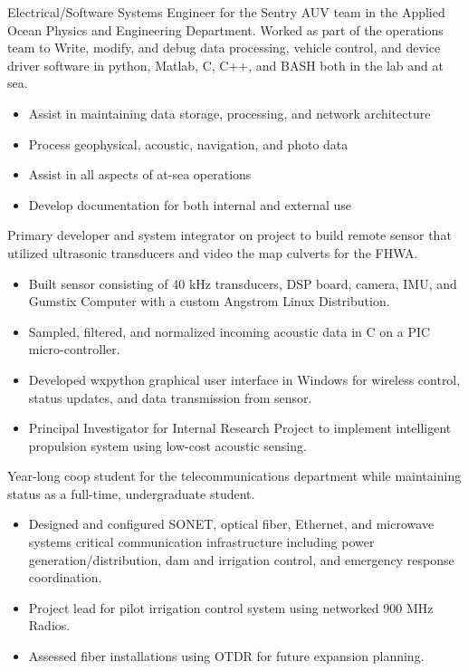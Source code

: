 \documentclass[11pt,a4paper,sans]{moderncv}
\begin{document}
{
Electrical/Software Systems Engineer for the Sentry AUV team in the Applied Ocean Physics 
and Engineering Department. Worked as part of the operations team to Write, modify, 
and debug data processing, vehicle control, and device driver software in python, 
Matlab, C, C++, and BASH both in the lab and at sea.
    \begin{itemize}
        \item Assist in maintaining data storage, processing, and network architecture
        \item Process geophysical, acoustic, navigation, and photo data
        \item Assist in all aspects of at-sea operations
        \item Develop documentation for both internal and external use
    \end{itemize}
}

{
    Primary developer and system integrator on project to build remote sensor that utilized ultrasonic
transducers and video the map culverts for the FHWA. 
     \begin{itemize}
        \item Built sensor consisting of 40 kHz transducers, DSP board, camera, IMU, and Gumstix Computer with a custom Angstrom Linux Distribution. 
        \item Sampled, filtered, and normalized incoming acoustic data in C on a 
            PIC micro-controller.
        \item Developed wxpython graphical user interface in Windows for wireless control, 
            status updates, and data transmission from sensor. 
        \item Principal Investigator for Internal Research Project to implement intelligent propulsion
            system using low-cost acoustic sensing. 
    \end{itemize}
    }

    {Year-long coop student for the telecommunications department while 
maintaining status as a full-time, undergraduate student.
 \begin{itemize}
        \item Designed and configured SONET, optical fiber, Ethernet, and microwave systems
            critical communication infrastructure including power generation/distribution, dam and 
            irrigation control, and emergency response coordination. 
        \item Project lead for pilot irrigation control system using networked
            900 MHz Radios. 
        \item Assessed fiber installations using OTDR for future expansion planning.
    \end{itemize}
}
\end{document}
